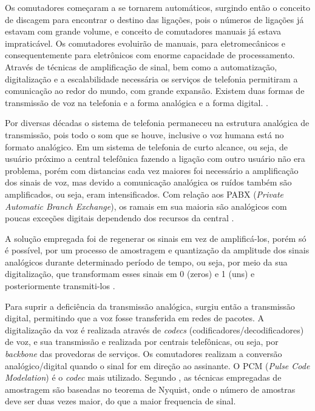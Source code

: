 Os comutadores começaram a se tornarem automáticos, surgindo então o conceito de discagem para encontrar o destino das ligações, pois o números de ligações já estavam com grande volume, e conceito de comutadores manuais já estava impraticável. Os comutadores evoluirão de manuais, para eletromecânicos e consequentemente para eletrônicos com enorme capacidade de processamento. Através de técnicas de amplificação de sinal, bem como a automatização, digitalização e a escalabilidade necessária os serviços de telefonia permitiram a comunicação ao redor do mundo, com grande expansão. Existem duas formas de transmissão de voz na telefonia e a forma analógica e a forma digital. \cite{books/daglib/0018909}.

Por diversas décadas o sistema de telefonia permaneceu na estrutura analógica de transmissão, pois todo o som que se houve, inclusive o voz humana está no formato analógico. Em um sistema de telefonia de curto alcance, ou seja, de usuário próximo a central telefônica fazendo a ligação com outro usuário não era problema, porém com distancias cada vez maiores foi necessário a amplificação dos sinais de voz, mas devido a comunicação analógica os ruídos também são amplificados, ou seja, eram intensificados. Com relação aos PABX (\textit{Private Automatic Branch Exchange}), os ramais em sua maioria são analógicos com poucas exceções digitais dependendo dos recursos da central \cite{books/daglib/0018909}.

A solução empregada foi de regenerar os sinais em vez de amplificá-los, porém só é possível, por um processo de amostragem e quantização da amplitude dos sinais analógicos durante determinado período de tempo, ou seja,  por meio da sua digitalização, que transformam esses sinais em 0 (zeros) e 1 (uns) e posteriormente transmiti-los \cite{alexandrekeller2014}.

Para suprir a deficiência da transmissão analógica, surgiu então a transmissão digital, permitindo que a voz fosse transferida em redes de pacotes. A digitalização da voz é realizada através de \textit{codecs} (codificadores/decodificadores) de voz, e sua transmissão e realizada por centrais telefônicas, ou seja, por \textit{backbone} das provedoras de serviços. Os comutadores realizam a conversão analógico/digital quando o sinal for em direção ao assinante. O PCM (\textit{Pulse Code Modelation}) é o \textit{codec} mais utilizado. Segundo , as técnicas empregadas de amostragem são baseadas no teorema de Nyquist, onde o número de amostras deve ser duas vezes maior, do que a maior frequencia de sinal.

